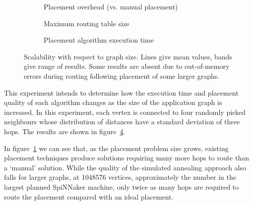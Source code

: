 				\begin{figure}
					\center
					\begin{subfigure}{\linewidth}
						\center
						
						\caption{Placement overhead (vs. manual placement)}
						\label{fig:placement-scalability-size-quality}
					\end{subfigure}
					
					\vspace*{1em}
					
					\begin{subfigure}{\linewidth}
						\center
						
						\caption{Maximum routing table size}
						\label{fig:placement-scalability-size-entries}
					\end{subfigure}
					
					\vspace*{1em}
					
					\begin{subfigure}{\linewidth}
						\center
						
						\caption{Placement algorithm execution time}
						\label{fig:placement-scalability-size-runtime}
					\end{subfigure}
					
					\caption[Placer scalability with respect to graph size.]%
					{Scalability with respect to graph size. Lines give mean
					values, bands give range of results. Some results are absent due to
					out-of-memory errors during routing following placement of some
					larger graphs.}
					\label{fig:placement-scalability-size}
				\end{figure}
				
				This experiment intends to determine how the execution time and
				placement quality of each algorithm changes as the size of the
				application graph is increased. In this experiment, each vertex is
				connected to four randomly picked neighbours whose distribution of
				distances have a standard deviation of three hops. The results are
				shown in figure~\ref{fig:placement-scalability-size}.
				
				In figure~\ref{fig:placement-scalability-size-quality} we can see that,
				as the placement problem size grows, existing placement techniques
				produce solutions requiring many more hops to route than a `manual'
				solution. While the quality of the simulated annealing approach also
				falls for larger graphs, at \num{1048576} vertices, approximately the
				number in the largest planned SpiNNaker machine, only twice as many
				hops are required to route the placement compared with an ideal
				placement.
				
